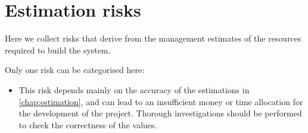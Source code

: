 	




\section{Estimation risks}

Here we collect risks that derive from the management estimates of the resources required to build the system.

Only one risk can be categorised here:
\begin{itemize}
	\item This risk depends mainly on the accuracy of the estimations in \cref{chap:estimation}, and can lead to an insufficient money or time allocation for the development of the project. Thorough investigations should be performed to check the correctness of the values.
\end{itemize}








	
